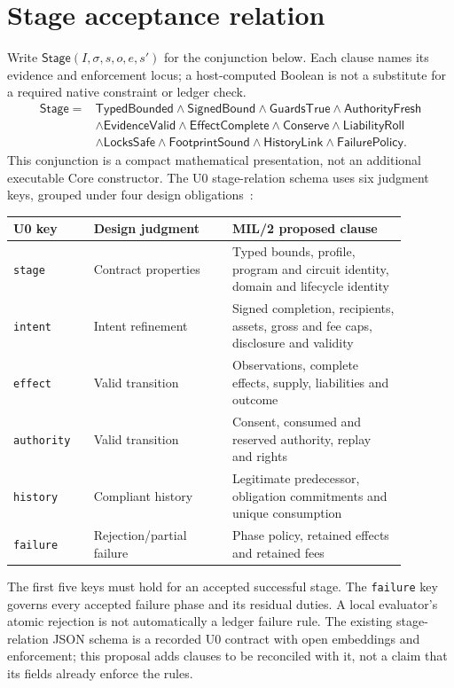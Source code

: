\documentclass[11pt,a4paper]{article}
\theoremstyle{definition}
\begin{document}
\section{Stage acceptance relation}\label{sec:stage}
Write $\mathsf{Stage}(I,\sigma,s,o,e,s')$ for the conjunction below. Each clause names its evidence and enforcement locus; a host-computed Boolean is not a substitute for a required native constraint or ledger check.
\begin{align*}
\mathsf{Stage}={}&\mathsf{TypedBounded}\land\mathsf{SignedBound}
\land\mathsf{GuardsTrue}\land\mathsf{AuthorityFresh}\\
&\land\mathsf{EvidenceValid}\land\mathsf{EffectComplete}
\land\mathsf{Conserve}\land\mathsf{LiabilityRoll}\\
&\land\mathsf{LocksSafe}\land\mathsf{FootprintSound}
\land\mathsf{HistoryLink}\land\mathsf{FailurePolicy}.
\end{align*}
This conjunction is a compact mathematical presentation, not an additional executable Core constructor. The U0 stage-relation schema uses six judgment keys, grouped under four design obligations~\cite{U0SCHEMA}: 
\begin{center}
\begin{tabular}{>{\RaggedRight\arraybackslash}p{0.18\linewidth}>{\RaggedRight\arraybackslash}p{0.31\linewidth}>{\RaggedRight\arraybackslash}p{0.39\linewidth}}
\toprule
U0 key & Design judgment & MIL/2 proposed clause\\
\midrule
\texttt{stage} & Contract properties & Typed bounds, profile, program and circuit identity, domain and lifecycle identity\\
\texttt{intent} & Intent refinement & Signed completion, recipients, assets, gross and fee caps, disclosure and validity\\
\texttt{effect} & Valid transition & Observations, complete effects, supply, liabilities and outcome\\
\texttt{authority} & Valid transition & Consent, consumed and reserved authority, replay and rights\\
\texttt{history} & Compliant history & Legitimate predecessor, obligation commitments and unique consumption\\
\texttt{failure} & Rejection/partial failure & Phase policy, retained effects and retained fees\\
\bottomrule
\end{tabular}
\end{center}
The first five keys must hold for an accepted successful stage. The \texttt{failure} key governs every accepted failure phase and its residual duties. A local evaluator's atomic rejection is not automatically a ledger failure rule. The existing stage-relation JSON schema is a recorded U0 contract with open embeddings and enforcement; this proposal adds clauses to be reconciled with it, not a claim that its fields already enforce the rules.
\end{document}
